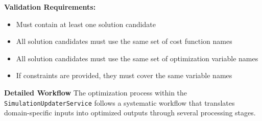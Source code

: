 \textbf{Validation Requirements:}
\begin{itemize}
	\item Must contain at least one solution candidate
	\item All solution candidates must use the same set of cost function names
	\item All solution candidates must use the same set of optimization variable names
	\item If constraints are provided, they must cover the same variable names
\end{itemize}







\bigskip
\textbf{Detailed Workflow}
The optimization process within the \texttt{SimulationUpdaterService} follows a systematic workflow that translates domain-specific inputs into optimized outputs through several processing stages.

